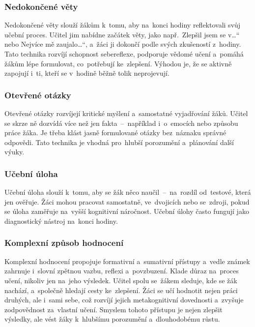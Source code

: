 \documentclass[male,czech,api_bc]{kitheses}
\begin{document}
\subsubsection{Nedokončené věty}

Nedokončené věty slouží žákům k~tomu, aby na~konci hodiny reflektovali svůj učební proces. Učitel jim nabídne začátek věty, jako např.~\quotedblbase Zlepšil jsem se v\ldots`` nebo \quotedblbase Nejvíce mě zaujalo\ldots``, a~žáci ji dokončí podle svých zkušeností z~hodiny. Tato technika rozvíjí schopnost sebereflexe, podporuje vědomé učení a~pomáhá žákům lépe formulovat, co~potřebují ke~zlepšení. Výhodou je, že se aktivně zapojují i~ti, kteří se v~hodině běžně tolik neprojevují.\cite{eduNedokonceneVety}

\subsubsection{Otevřené otázky}

Otevřené otázky rozvíjejí kritické myšlení a~samostatné vyjadřování žáků. Učitel se skrze ně dozvídá více než jen fakta~--~například i~o~emocích nebo způsobu práce žáka. Je třeba klást jasně formulované otázky bez~náznaku správné odpovědi. Tato technika je vhodná pro~hlubší porozumění a~plánování další výuky.\cite{eduOtevreneOtazky}

\subsubsection{Učební úloha}

Učební úloha slouží k~tomu, aby se žák něco naučil~--~na~rozdíl od~testové, která jen ověřuje. Žáci mohou pracovat samostatně, ve~dvojicích nebo se~zdroji, pokud se úloha zaměřuje na~vyšší kognitivní náročnost. Učební úlohy často fungují jako diagnostický nástroj na~konci hodiny.\cite{eduUcebniUloha}

\subsubsection{Komplexní způsob hodnocení}

Komplexní hodnocení propojuje formativní a~sumativní přístupy a~vedle známek zahrnuje i~slovní zpětnou vazbu, reflexi a~povzbuzení. Klade důraz na~proces učení, nikoliv jen na~jeho výsledek. Učitel spolu se~žákem sleduje, kde se žák nachází, a~společně hledají cesty ke~zlepšení. Žáci se učí hodnotit nejen práci druhých, ale i~sami sebe, což rozvíjí jejich metakognitivní dovednosti a~zvyšuje zodpovědnost za~vlastní učení. Smyslem tohoto přístupu je nejen zlepšit výsledky, ale vést žáky k~hlubšímu porozumění a~dlouhodobému růstu.\cite{eduKomplexniZpusobHodnoceni}
\end{document}
